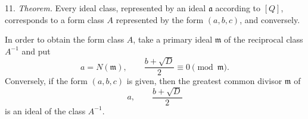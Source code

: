 \documentclass[11pt]{article}
\begin{document}
11. \emph{Theorem.} Every ideal class, represented by an ideal $\mathfrak a$ according to $[Q]$, corresponds to a form class $A$ represented by the form $(a,b,c)$, and conversely.

In order to obtain the form class $A$, take a primary ideal $\mathfrak m$ of the reciprocal class $A^{-1}$ and put
\[
 a=N(\mathfrak m),\qquad
 \frac{b+\sqrt D}{2}\equiv0\pmod{\mathfrak m}.
\]
Conversely, if the form $(a,b,c)$ is given, then the greatest common divisor $\mathfrak m$ of
\[
 a,\qquad \frac{b+\sqrt D}{2}
\]
is an ideal of the class $A^{-1}$.
\end{document}

